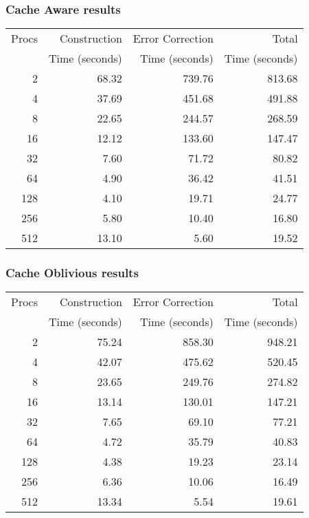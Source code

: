 \documentclass[integrals, nointegrals, article, 12pt, a4paper]{article}
\begin{document}
\subsubsection{Cache Aware results}
\label{sec-2-1-2}

\begin{center}
\begin{tabular}{rrrr}
\hline
Procs & Construction & Error Correction & Total\\
 & Time (seconds) & Time (seconds) & Time (seconds)\\
\hline
2 & 68.32 & 739.76 & 813.68\\
4 & 37.69 & 451.68 & 491.88\\
8 & 22.65 & 244.57 & 268.59\\
16 & 12.12 & 133.60 & 147.47\\
32 & 7.60 & 71.72 & 80.82\\
64 & 4.90 & 36.42 & 41.51\\
128 & 4.10 & 19.71 & 24.77\\
256 & 5.80 & 10.40 & 16.80\\
512 & 13.10 & 5.60 & 19.52\\
\hline
\end{tabular}
\end{center}
\subsubsection{Cache Oblivious results}
\label{sec-2-1-3}

\begin{center}
\begin{tabular}{rrrr}
\hline
Procs & Construction & Error Correction & Total\\
 & Time (seconds) & Time (seconds) & Time (seconds)\\
\hline
2 & 75.24 & 858.30 & 948.21\\
4 & 42.07 & 475.62 & 520.45\\
8 & 23.65 & 249.76 & 274.82\\
16 & 13.14 & 130.01 & 147.21\\
32 & 7.65 & 69.10 & 77.21\\
64 & 4.72 & 35.79 & 40.83\\
128 & 4.38 & 19.23 & 23.14\\
256 & 6.36 & 10.06 & 16.49\\
512 & 13.34 & 5.54 & 19.61\\
\hline
\end{tabular}
\end{center}
\end{document}
